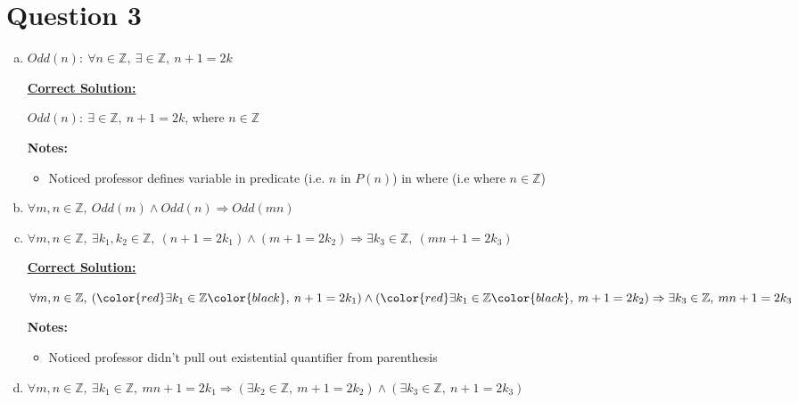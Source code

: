 \documentclass[12pt]{article}
\begin{document}
\section*{Question 3}
\begin{enumerate}[a.]
    \item $Odd(n):\:\forall n \in \mathbb{Z},\:\exists \in \mathbb{Z},\:n+1=2k$

    \bigskip

    \begin{mdframed}
        \underline{\textbf{Correct Solution:}}

        \bigskip

        $Odd(n):\:\exists \in \mathbb{Z},\:n+1=2k$, \color{red}where $n \in \mathbb{Z}$\color{black}
    \end{mdframed}

    \bigskip

    \textbf{Notes:}

    \begin{itemize}
        \item Noticed professor defines variable in predicate (i.e. $n$ in $P(n)$)
    in where (i.e where $n \in \mathbb{Z}$)
    \end{itemize}

    \item $\forall m,n \in \mathbb{Z},\:Odd(m) \land Odd(n) \Rightarrow Odd(mn)$
    \item $\forall m,n \in \mathbb{Z},\:\exists k_1,k_2 \in \mathbb{Z},\:(n+1=2k_1)
    \land (m+1=2k_2) \Rightarrow \exists k_3 \in \mathbb{Z},\:(mn+1=2k_3)$

    \bigskip

    \begin{mdframed}
        \underline{\textbf{Correct Solution:}}

        \bigskip

        $\forall m,n \in \mathbb{Z},\:(\color{red}\exists k_1 \in \mathbb{Z}\color{black},\:n+1=2k_1) \land
        (\color{red}\exists k_1 \in \mathbb{Z}\color{black},\:m+1=2k_2) \Rightarrow \exists k_3 \in \mathbb{Z},\:mn+1=2k_3$
    \end{mdframed}

    \bigskip

    \textbf{Notes:}

    \begin{itemize}
        \item Noticed professor didn't pull out existential quantifier from parenthesis
    \end{itemize}

    \item $\forall m,n \in \mathbb{Z},\:\exists k_1 \in \mathbb{Z},\: mn + 1 = 2k_1
    \Rightarrow (\exists k_2 \in \mathbb{Z},\:m+1 = 2k_2) \land (\exists k_3 \in \mathbb{Z},\:
    n + 1 = 2k_3)$
\end{enumerate}
\end{document}
